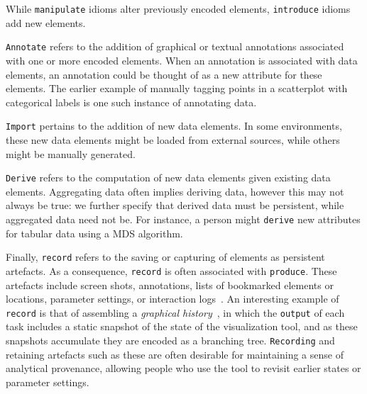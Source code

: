 While {\tt manipulate} idioms alter previously encoded elements, {\tt introduce} idioms add new elements.

{\tt Annotate}
refers to the addition of graphical or textual annotations associated with one or more encoded elements.
When an annotation is associated with data elements, an annotation could be thought of as a new attribute for these elements.
The earlier example of manually tagging points in a scatterplot with categorical labels is one such instance of annotating data.

{\tt Import}
pertains to the addition of new data elements.
In some environments, these new data elements might be loaded from external sources, while others might be manually generated.

{\tt Derive}
refers to the computation of new data elements given existing data elements.
Aggregating data often implies deriving data, however this may not always be true: we further specify that derived data must be persistent, while aggregated data need not be.
For instance, a person might {\tt derive} new attributes for tabular data using a \ac{MDS} algorithm.

Finally, {\tt record}
refers to the saving or capturing of elements as persistent artefacts.
As a consequence, {\tt record} is often associated with {\tt produce}.
These artefacts include screen shots, annotations, lists of bookmarked elements or locations, parameter settings, or interaction logs~\cite{Shrinivasan2008}.
An interesting example of {\tt record} is that of assembling a {\it graphical history}~\cite{Heer2008}, in which the {\tt output} of each task includes a static snapshot of the state of the visualization tool, and as these snapshots accumulate they are encoded as a branching tree.
{\tt Recording} and retaining artefacts such as these are often desirable for maintaining a sense of analytical provenance, allowing people who use the tool to revisit earlier states or parameter settings.


